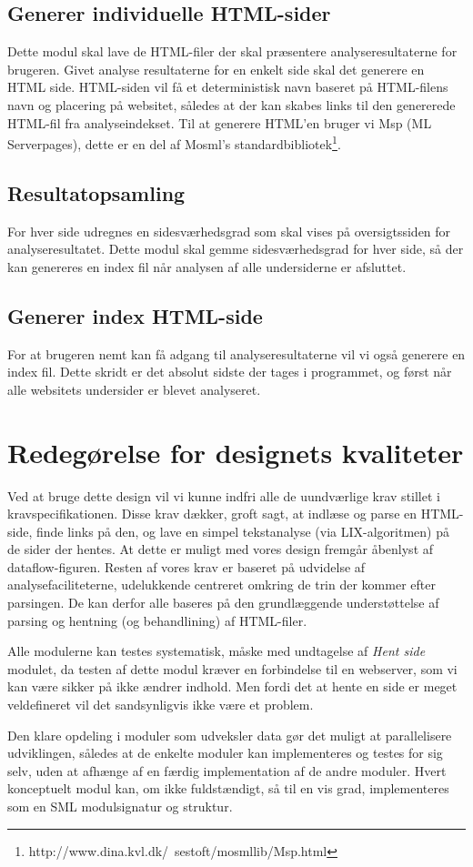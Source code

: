 \documentclass[a4paper,oneside,article, titlepage]{article}
\begin{document}
\subsection{Generer individuelle HTML-sider}
Dette modul skal lave de HTML-filer der skal præsentere
analyseresultaterne for brugeren. Givet analyse resultaterne for en
enkelt side skal det generere en HTML side. HTML-siden vil få et
deterministisk navn baseret på HTML-filens navn og placering på
websitet, således at der kan skabes links til den genererede HTML-fil
fra analyseindekset. Til at generere HTML'en bruger vi Msp (ML
Serverpages), dette er en del af Mosml's
standardbibliotek\footnote{http://www.dina.kvl.dk/~sestoft/mosmllib/Msp.html}.

\subsection{Resultatopsamling}
For hver side udregnes en sidesværhedsgrad som skal vises på
oversigtssiden for analyseresultatet. Dette modul skal gemme
sidesværhedsgrad for hver side, så der kan genereres en index fil når
analysen af alle undersiderne er afsluttet.

\subsection{Generer index HTML-side}
For at brugeren nemt kan få adgang til analyseresultaterne vil vi også
generere en index fil. Dette skridt er det absolut sidste der tages i
programmet, og først når alle websitets undersider er blevet
analyseret. 


\section{Redegørelse for designets kvaliteter}
Ved at bruge dette design vil vi kunne indfri alle de uundværlige krav
stillet i kravspecifikationen. Disse krav dækker, groft sagt, at
indlæse og parse en HTML-side, finde links på den, og lave en simpel
tekstanalyse (via LIX-algoritmen) på de sider der hentes. At dette er
muligt med vores design fremgår åbenlyst af dataflow-figuren. Resten
af vores krav er baseret på udvidelse af analysefaciliteterne,
udelukkende centreret omkring de trin der kommer efter parsingen. De
kan derfor alle baseres på den grundlæggende understøttelse af parsing
og hentning (og behandlining) af HTML-filer.

Alle modulerne kan testes systematisk, måske med undtagelse af
\textit{Hent side} modulet, da testen af dette modul kræver en
forbindelse til en webserver, som vi kan være sikker på ikke ændrer
indhold. Men fordi det at hente en side er meget veldefineret vil det
sandsynligvis ikke være et problem.

Den klare opdeling i moduler som udveksler data gør det muligt at
parallelisere udviklingen, således at de enkelte moduler kan
implementeres og testes for sig selv, uden at afhænge af en færdig
implementation af de andre moduler. Hvert konceptuelt modul kan, om
ikke fuldstændigt, så til en vis grad, implementeres som en SML
modulsignatur og struktur.
\end{document}
